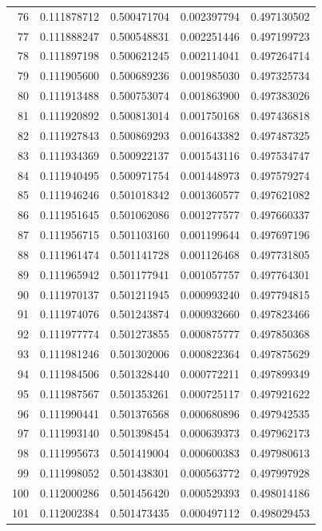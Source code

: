 \begin{tabular}{rcccc}
76 & 0.111878712 & 0.500471704 & 0.002397794 & 0.497130502 \\
77 & 0.111888247 & 0.500548831 & 0.002251446 & 0.497199723 \\
78 & 0.111897198 & 0.500621245 & 0.002114041 & 0.497264714 \\
79 & 0.111905600 & 0.500689236 & 0.001985030 & 0.497325734 \\
80 & 0.111913488 & 0.500753074 & 0.001863900 & 0.497383026 \\
81 & 0.111920892 & 0.500813014 & 0.001750168 & 0.497436818 \\
82 & 0.111927843 & 0.500869293 & 0.001643382 & 0.497487325 \\
83 & 0.111934369 & 0.500922137 & 0.001543116 & 0.497534747 \\
84 & 0.111940495 & 0.500971754 & 0.001448973 & 0.497579274 \\
85 & 0.111946246 & 0.501018342 & 0.001360577 & 0.497621082 \\
86 & 0.111951645 & 0.501062086 & 0.001277577 & 0.497660337 \\
87 & 0.111956715 & 0.501103160 & 0.001199644 & 0.497697196 \\
88 & 0.111961474 & 0.501141728 & 0.001126468 & 0.497731805 \\
89 & 0.111965942 & 0.501177941 & 0.001057757 & 0.497764301 \\
90 & 0.111970137 & 0.501211945 & 0.000993240 & 0.497794815 \\
91 & 0.111974076 & 0.501243874 & 0.000932660 & 0.497823466 \\
92 & 0.111977774 & 0.501273855 & 0.000875777 & 0.497850368 \\
93 & 0.111981246 & 0.501302006 & 0.000822364 & 0.497875629 \\
94 & 0.111984506 & 0.501328440 & 0.000772211 & 0.497899349 \\
95 & 0.111987567 & 0.501353261 & 0.000725117 & 0.497921622 \\
96 & 0.111990441 & 0.501376568 & 0.000680896 & 0.497942535 \\
97 & 0.111993140 & 0.501398454 & 0.000639373 & 0.497962173 \\
98 & 0.111995673 & 0.501419004 & 0.000600383 & 0.497980613 \\
99 & 0.111998052 & 0.501438301 & 0.000563772 & 0.497997928 \\
100 & 0.112000286 & 0.501456420 & 0.000529393 & 0.498014186 \\
101 & 0.112002384 & 0.501473435 & 0.000497112 & 0.498029453 \\

\end{tabular}
